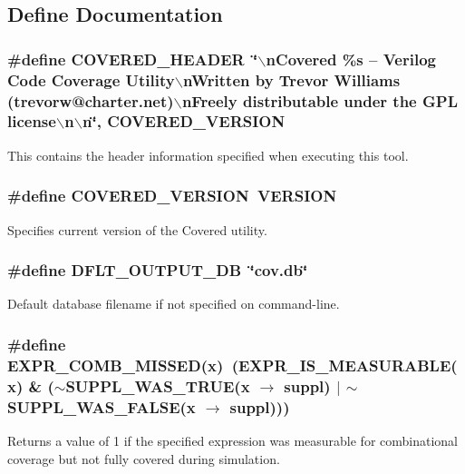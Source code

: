 \subsection{Define Documentation}
\subsubsection{\setlength{\rightskip}{0pt plus 5cm}\#define COVERED\_\-HEADER\ \char`\"{}$\backslash$n\-Covered \%s -- Verilog Code Coverage Utility$\backslash$n\-Written by Trevor Williams  (trevorw@charter.net)$\backslash$n\-Freely distributable under the GPL license$\backslash$n$\backslash$n\char`\"{}, COVERED\_\-VERSION}\label{defines_8h_a1}


This contains the header information specified when executing this tool. 
\subsubsection{\setlength{\rightskip}{0pt plus 5cm}\#define COVERED\_\-VERSION\ VERSION}\label{defines_8h_a0}


Specifies current version of the Covered utility. 
\subsubsection{\setlength{\rightskip}{0pt plus 5cm}\#define DFLT\_\-OUTPUT\_\-DB\ \char`\"{}cov.db\char`\"{}}\label{defines_8h_a2}


Default database filename if not specified on command-line. 
\subsubsection{\setlength{\rightskip}{0pt plus 5cm}\#define EXPR\_\-COMB\_\-MISSED(x)\ (EXPR\_\-IS\_\-MEASURABLE(x) \& ($\sim$SUPPL\_\-WAS\_\-TRUE(x $\rightarrow$ suppl) $|$ $\sim$SUPPL\_\-WAS\_\-FALSE(x $\rightarrow$ suppl)))}\label{defines_8h_a86}


Returns a value of 1 if the specified expression was measurable for combinational  coverage but not fully covered during simulation. 
